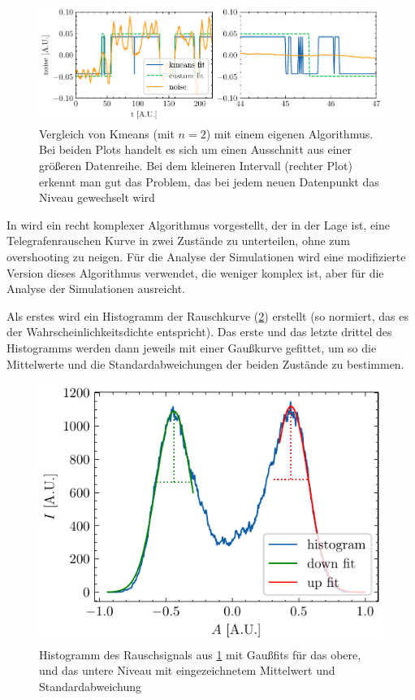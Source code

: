 \documentclass[main.tex]{subfiles}
\begin{document}
\begin{figure}[h]
    \centering
    \includegraphics{bilder/plots/theo-vis/telegraph_fit_comp.pdf}
    \caption[Vergleich von Kmeans (mit \(n=2\)) mit einem eigenen Algorithmus.]{Vergleich von Kmeans (mit \(n=2\)) mit einem eigenen Algorithmus. Bei beiden Plots handelt es sich um einen Ausschnitt aus einer größeren Datenreihe. Bei dem kleineren Intervall (rechter Plot) erkennt man gut das Problem, das bei jedem neuen Datenpunkt das Niveau gewechselt wird}\label{fig:fit_comp}
\end{figure}

In \cite{random-telegraph-analysis} wird ein recht komplexer Algorithmus vorgestellt, der in der Lage ist, eine Telegrafenrauschen Kurve in zwei Zustände zu unterteilen, ohne zum overshooting zu neigen. Für die Analyse der Simulationen wird eine modifizierte Version dieses Algorithmus verwendet, die weniger komplex ist, aber für die Analyse der Simulationen ausreicht.

Als erstes wird ein Histogramm der Rauschkurve (\cref{fig:hist_fit}) erstellt (so normiert, das es der Wahrscheinlichkeitsdichte entspricht). \label{sec:algo}
Das erste und das letzte drittel des Histogramms werden dann jeweils mit einer Gaußkurve gefittet, um so die Mittelwerte und die Standardabweichungen der beiden Zustände zu bestimmen.

\begin{figure}[h]
    \centering
    \includegraphics{bilder/plots/theo-vis/hist_fit.pdf}
    \caption{Histogramm des Rauschsignals aus \cref{fig:fit_comp} mit Gaußfits für das obere, und das untere Niveau mit eingezeichnetem Mittelwert und Standardabweichung}
    \label{fig:hist_fit}
\end{figure}
\end{document}
